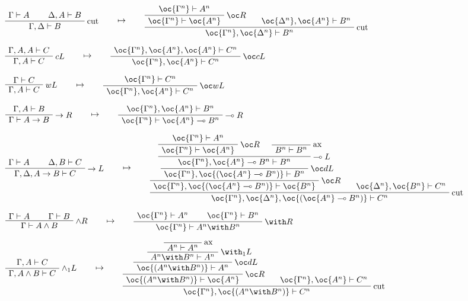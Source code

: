 \(\AxRule{\Gamma\vdash A}
\AxRule{\Delta,A\vdash B}
\LabelRule{\rulename{cut}}
\BinRule{\Gamma,\Delta\vdash B}
\DisplayProof
\qquad\mapsto\qquad
\AxRule{\oc{\Gamma^n}\vdash A^n}
\LabelRule{\oc R}
\UnaRule{\oc{\Gamma^n}\vdash \oc{A^n}}
\AxRule{\oc{\Delta^n},\oc{A^n}\vdash B^n}
\LabelRule{\rulename{cut}}
\BinRule{\oc{\Gamma^n},\oc{\Delta^n}\vdash B^n}
\DisplayProof\)

\(\AxRule{\Gamma,A,A\vdash C}
\LabelRule{c L}
\UnaRule{\Gamma,A\vdash C}
\DisplayProof
\qquad\mapsto\qquad
\AxRule{\oc{\Gamma^n},\oc{A^n},\oc{A^n}\vdash C^n}
\LabelRule{\oc c L}
\UnaRule{\oc{\Gamma^n},\oc{A^n}\vdash C^n}
\DisplayProof\)

\(\AxRule{\Gamma\vdash C}
\LabelRule{w L}
\UnaRule{\Gamma,A\vdash C}
\DisplayProof
\qquad\mapsto\qquad
\AxRule{\oc{\Gamma^n}\vdash C^n}
\LabelRule{\oc w L}
\UnaRule{\oc{\Gamma^n},\oc{A^n}\vdash C^n}
\DisplayProof\)

\(\AxRule{\Gamma,A\vdash B}
\LabelRule{\imp R}
\UnaRule{\Gamma\vdash A\imp B}
\DisplayProof
\qquad\mapsto\qquad
\AxRule{\oc{\Gamma^n},\oc{A^n}\vdash B^n}
\LabelRule{\limp R}
\UnaRule{\oc{\Gamma^n}\vdash \oc{A^n}\limp B^n}
\DisplayProof\)

\(\AxRule{\Gamma\vdash A}
\AxRule{\Delta,B\vdash C}
\LabelRule{\imp L}
\BinRule{\Gamma,\Delta,A\imp B\vdash C}
\DisplayProof
\qquad\mapsto\qquad
\AxRule{\oc{\Gamma^n}\vdash A^n}
\LabelRule{\oc R}
\UnaRule{\oc{\Gamma^n}\vdash \oc{A^n}}
\LabelRule{\rulename{ax}}
\NulRule{B^n\vdash B^n}
\LabelRule{\limp L}
\BinRule{\oc{\Gamma^n},\oc{A^n}\limp B^n\vdash B^n}
\LabelRule{\oc d L}
\UnaRule{\oc{\Gamma^n},\oc{(\oc{A^n}\limp B^n)}\vdash B^n}
\LabelRule{\oc R}
\UnaRule{\oc{\Gamma^n},\oc{(\oc{A^n}\limp B^n)}\vdash \oc{B^n}}
\AxRule{\oc{\Delta^n},\oc{B^n}\vdash C^n}
\LabelRule{\rulename{cut}}
\BinRule{\oc{\Gamma^n},\oc{\Delta^n},\oc{(\oc{A^n}\limp B^n)}\vdash C^n}
\DisplayProof\)

\(\AxRule{\Gamma\vdash A}
\AxRule{\Gamma\vdash B}
\LabelRule{\wedge R}
\BinRule{\Gamma\vdash A\wedge B}
\DisplayProof
\qquad\mapsto\qquad
\AxRule{\oc{\Gamma^n}\vdash A^n}
\AxRule{\oc{\Gamma^n}\vdash B^n}
\LabelRule{\with R}
\BinRule{\oc{\Gamma^n}\vdash A^n\with B^n}
\DisplayProof\)

\(\AxRule{\Gamma,A\vdash C}
\LabelRule{\wedge_1 L}
\UnaRule{\Gamma,A\wedge B\vdash C}
\DisplayProof
\qquad\mapsto\qquad
\LabelRule{\rulename{ax}}
\NulRule{A^n\vdash A^n}
\LabelRule{\with_1 L}
\UnaRule{A^n\with B^n\vdash A^n}
\LabelRule{\oc d L}
\UnaRule{\oc{(A^n\with B^n)}\vdash A^n}
\LabelRule{\oc R}
\UnaRule{\oc{(A^n\with B^n)}\vdash \oc{A^n}}
\AxRule{\oc{\Gamma^n},\oc{A^n}\vdash C^n}
\LabelRule{\rulename{cut}}
\BinRule{\oc{\Gamma^n},\oc{(A^n\with B^n)}\vdash C^n}
\DisplayProof\)

